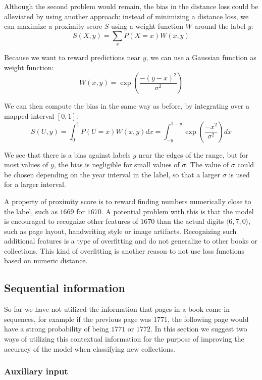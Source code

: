 Although the second problem would remain, the bias in the distance loss could be alleviated by using another approach:
instead of minimizing a distance loss, we can maximize a proximity score $S$ using a weight function $W$ around the label $y$:
\[
S(X, y) = \sum_x P(X=x) W(x, y)
\]

Because we want to reward predictions near $y$, we can use a Gaussian function as weight function:
\[
W(x, y) = \exp \left( \frac{-(y-x)^2}{\sigma^2} \right)
\]

We can then compute the bias in the same way as before, by integrating over a mapped interval $[0,1]$:
\[
S(U, y) = \int_0^1 P(U=x) W(x, y) dx =
\int_{-y}^{1-y} \exp \left( \frac{-x^2}{\sigma^2} \right) dx
\]

We see that there is a bias against labels $y$ near the edges of the range, but for most values of $y$, the bias is negligible for small values of $\sigma$. The value of $\sigma$ could be chosen depending on the year interval in the label, so that a larger $\sigma$ is used for a larger interval.

A property of proximity score is to reward finding numbers numerically close to the label, such as $1669$ for $1670$. A potential problem with this is that the model is encouraged to recognize other features of $1670$ than the actual digits $\langle 6, 7, 0 \rangle$, such as page layout, handwriting style or image artifacts. Recognizing such additional features is a type of overfitting and do not generalize to other books or collections.
This kind of overfitting is another reason to not use loss functions based on numeric distance.

\subsection{Sequential information}

So far we have not utilized the information that pages in a book come in sequences, for example if the previous page was $1771$, the following page would have a strong probability of being $1771$ or $1772$.
In this section we suggest two ways of utilizing this contextual information for the purpose of improving the accuracy of the model when classifying new collections.

\subsubsection{Auxiliary input}


